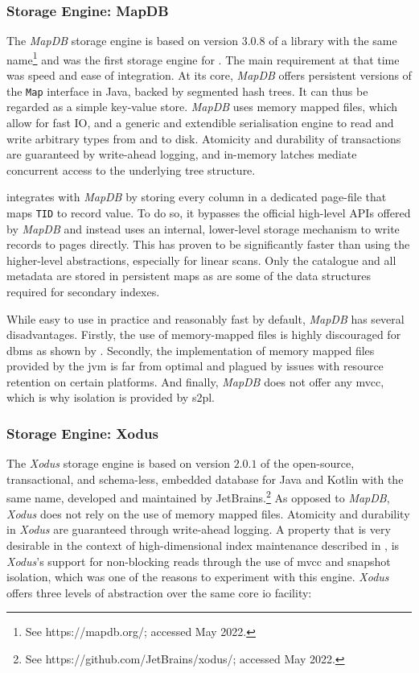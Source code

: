 \subsubsection{Storage Engine: MapDB}

The \emph{MapDB} storage engine is based on version $3.0.8$ of a library with the same name\footnote{See https://mapdb.org/; accessed May 2022.} and was the first storage engine for \cottontail{}. The main requirement at that time was speed and ease of integration. At its core, \emph{MapDB} offers persistent versions of the \texttt{Map} interface in Java, backed by segmented hash trees. It can thus be regarded as a simple key-value store. \emph{MapDB} uses memory mapped files, which allow for fast IO, and a generic and extendible serialisation engine to read and write arbitrary types from and to disk. Atomicity and durability of transactions are guaranteed by write-ahead logging, and in-memory latches mediate concurrent access to the underlying tree structure.

\cottontail{} integrates with \emph{MapDB} by storing every column in a dedicated page-file that maps \texttt{TID} to record value. To do so, it bypasses the official high-level APIs offered by \emph{MapDB} and instead uses an internal, lower-level storage mechanism to write records to pages directly. This has proven to be significantly faster than using the higher-level abstractions, especially for linear scans. Only the catalogue and all metadata are stored in persistent maps as are some of the data structures required for secondary indexes.

While easy to use in practice and reasonably fast by default, \emph{MapDB} has several disadvantages. Firstly, the use of memory-mapped files is highly discouraged for \acrshort{dbms} as shown by \cite{Crotty:2022Are}. Secondly, the implementation of memory mapped files provided by the \acrshort{jvm} is far from optimal and plagued by issues with resource retention on certain platforms. And finally, \emph{MapDB} does not offer any \acrshort{mvcc}, which is why isolation is provided by \acrshort{s2pl}.

\subsubsection{Storage Engine: Xodus}
The \emph{Xodus} storage engine is based on version $2.0.1$ of the open-source, transactional, and schema-less, embedded database for Java and Kotlin with the same name, developed and maintained by JetBrains.\footnote{See https://github.com/JetBrains/xodus/; accessed May 2022.} As opposed to \emph{MapDB}, \emph{Xodus} does not rely on the use of memory mapped files. Atomicity and durability in \emph{Xodus} are guaranteed through write-ahead logging. A property that is very desirable in the context of high-dimensional index maintenance described in , is \emph{Xodus}'s support for non-blocking reads through the use of \acrshort{mvcc} and snapshot isolation, which was one of the reasons to experiment with this engine. \emph{Xodus} offers three levels of abstraction over the same core \acrshort{io} facility:


